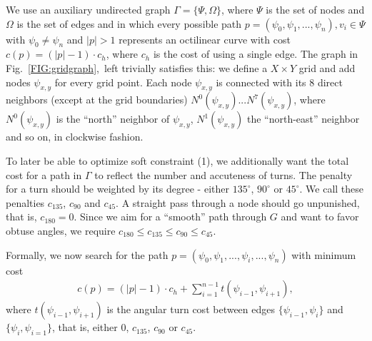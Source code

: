 \documentclass{sig-alternate-sigmod09}
\begin{document}
We use an auxiliary undirected graph $\Gamma = \{\Psi, \Omega\}$, where $\Psi$ is the set of nodes and $\Omega$ is the set of edges and in which every possible path $p = (\psi_0, \psi_1, ..., \psi_n), v_i \in \Psi$ with $\psi_0 \neq \psi_n$ and $|p| > 1$ represents an octilinear curve with cost $c(p) = (|p| - 1) \cdot c_h$, where $c_h$ is the cost of using a single edge.
The graph in Fig.~\ref{FIG:gridgraph},~left trivially satisfies this: we define a $X\times Y$ grid and add nodes $\psi_{x,y}$ for every grid point.
Each node $\psi_{x,y}$ is connected with its 8 direct neighbors (except at the grid boundaries) $N^0(\psi_{x,y}) ... N^7(\psi_{x, y})$, where $N^0(\psi_{x, y})$ is the ``north'' neighbor of $\psi_{x, y}$,  $N^1(\psi_{x, y})$ the ``north-east'' neighbor and so on, in clockwise fashion.

To later be able to optimize soft constraint (1), we additionally want the total cost for a path in $\Gamma$ to reflect the number and accuteness of turns.
The penalty for a turn should be weighted by its degree - either $135^{\circ}$, $90^{\circ}$ or $45^{\circ}$.
We call these penalties $c_{135}$, $c_{90}$ and $c_{45}$.
A straight pass through a node should go unpunished, that is, $c_{180} = 0$.
Since we aim for a ``smooth'' path through $G$ and want to favor obtuse angles, we require $c_{180} \leq c_{135} \leq c_{90} \leq c_{45}$.

Formally, we now search for the path $p = (\psi_0, \psi_1, ..., \psi_i, ..., \psi_n)$ with minimum cost
\begin{align}
	c(p) = (|p| - 1) \cdot c_h + \sum_{i=1}^{n - 1} t(\psi_{i-1}, \psi_{i+1}),
\end{align}
where $t(\psi_{i-1}, \psi_{i+1})$ is the angular turn cost between edges $\{\psi_{i-1}, \psi_{i}\}$ and $\{\psi_{i}, \psi_{i=1}\}$, that is, either 0, $c_{135}$, $c_{90}$ or $c_{45}$.
\end{document}
